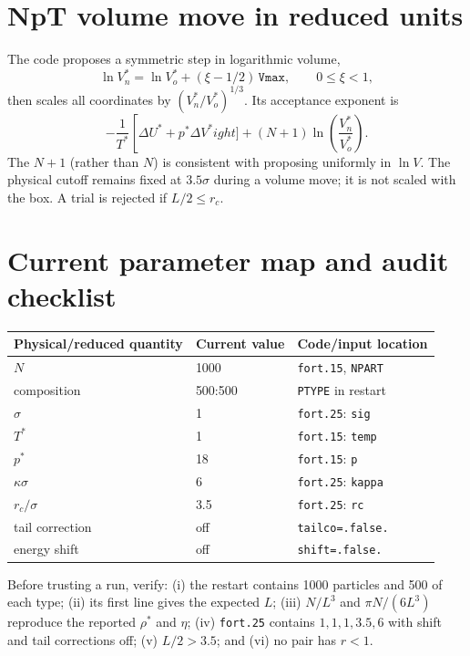 \documentclass[11pt,a4paper]{article}
\newcommand{\code}[1]{\texttt{#1}}
\begin{document}
\section{NpT volume move in reduced units}
The code proposes a symmetric step in logarithmic volume,
\begin{equation}
 \ln V_n^*=\ln V_o^*+(\xi-1/2)\,\code{Vmax},\qquad 0\le\xi<1,
\end{equation}
then scales all coordinates by $(V_n^*/V_o^*)^{1/3}$.  Its acceptance
exponent is
\begin{equation}
 -\frac{1}{T^*}\left[\Delta U^*+p^*\Delta V^*
ight]
 +(N+1)\ln\left(\frac{V_n^*}{V_o^*}\right).
\end{equation}
The $N+1$ (rather than $N$) is consistent with proposing uniformly in
$\ln V$.  The physical cutoff remains fixed at $3.5\sigma$ during a volume
move; it is not scaled with the box.  A trial is rejected if $L/2\le r_c$.

\section{Current parameter map and audit checklist}
\begin{center}
\begin{tabular}{lll}
\toprule
Physical/reduced quantity & Current value & Code/input location\\
\midrule
$N$ & 1000 & \code{fort.15}, \code{NPART}\\
composition & 500:500 & \code{PTYPE} in restart\\
$\sigma$ & 1 & \code{fort.25}: \code{sig}\\
$T^*$ & 1 & \code{fort.15}: \code{temp}\\
$p^*$ & 18 & \code{fort.15}: \code{p}\\
$\kappa\sigma$ & 6 & \code{fort.25}: \code{kappa}\\
$r_c/\sigma$ & 3.5 & \code{fort.25}: \code{rc}\\
tail correction & off & \code{tailco=.false.}\\
energy shift & off & \code{shift=.false.}\\
\bottomrule
\end{tabular}
\end{center}

Before trusting a run, verify: (i) the restart contains 1000 particles and
500 of each type; (ii) its first line gives the expected $L$; (iii)
$N/L^3$ and $\pi N/(6L^3)$ reproduce the reported $\rho^*$ and $\eta$;
(iv) \code{fort.25} contains $1,1,1,3.5,6$ with shift and tail corrections
off; (v) $L/2>3.5$; and (vi) no pair has $r<1$.
\end{document}
